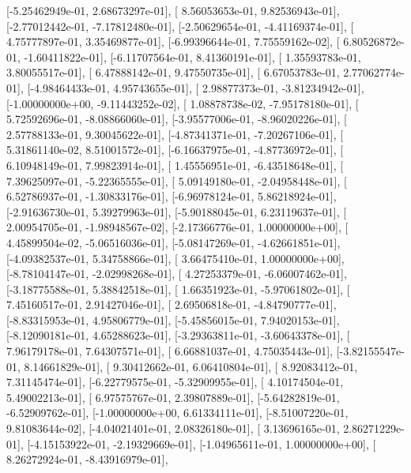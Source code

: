 \documentclass{article}
\begin{document}
       [-5.25462949e-01,  2.68673297e-01],
       [ 8.56053653e-01,  9.82536943e-01],
       [-2.77012442e-01, -7.17812480e-01],
       [-2.50629654e-01, -4.41169374e-01],
       [ 4.75777897e-01,  3.35469877e-01],
       [-6.99396644e-01,  7.75559162e-02],
       [ 6.80526872e-01, -1.60411822e-01],
       [-6.11707564e-01,  8.41360191e-01],
       [ 1.35593783e-01,  3.80055517e-01],
       [ 6.47888142e-01,  9.47550735e-01],
       [ 6.67053783e-01,  2.77062774e-01],
       [-4.98464433e-01,  4.95743655e-01],
       [ 2.98877373e-01, -3.81234942e-01],
       [-1.00000000e+00, -9.11443252e-02],
       [ 1.08878738e-02, -7.95178180e-01],
       [ 5.72592696e-01, -8.08866060e-01],
       [-3.95577006e-01, -8.96020226e-01],
       [ 2.57788133e-01,  9.30045622e-01],
       [-4.87341371e-01, -7.20267106e-01],
       [ 5.31861140e-02,  8.51001572e-01],
       [-6.16637975e-01, -4.87736972e-01],
       [ 6.10948149e-01,  7.99823914e-01],
       [ 1.45556951e-01, -6.43518648e-01],
       [ 7.39625097e-01, -5.22365555e-01],
       [ 5.09149180e-01, -2.04958448e-01],
       [ 6.52786937e-01, -1.30833176e-01],
       [-6.96978124e-01,  5.86218924e-01],
       [-2.91636730e-01,  5.39279963e-01],
       [-5.90188045e-01,  6.23119637e-01],
       [ 2.00954705e-01, -1.98948567e-02],
       [-2.17366776e-01,  1.00000000e+00],
       [ 4.45899504e-02, -5.06516036e-01],
       [-5.08147269e-01, -4.62661851e-01],
       [-4.09382537e-01,  5.34758866e-01],
       [ 3.66475410e-01,  1.00000000e+00],
       [-8.78104147e-01, -2.02998268e-01],
       [ 4.27253379e-01, -6.06007462e-01],
       [-3.18775588e-01,  5.38842518e-01],
       [ 1.66351923e-01, -5.97061802e-01],
       [ 7.45160517e-01,  2.91427046e-01],
       [ 2.69506818e-01, -4.84790777e-01],
       [-8.83315953e-01,  4.95806779e-01],
       [-5.45856015e-01,  7.94020153e-01],
       [-8.12090181e-01,  4.65288623e-01],
       [-3.29363811e-01, -3.60643378e-01],
       [ 7.96179178e-01,  7.64307571e-01],
       [ 6.66881037e-01,  4.75035443e-01],
       [-3.82155547e-01,  8.14661829e-01],
       [ 9.30412662e-01,  6.06410804e-01],
       [ 8.92083412e-01,  7.31145474e-01],
       [-6.22779575e-01, -5.32909955e-01],
       [ 4.10174504e-01,  5.49002213e-01],
       [ 6.97575767e-01,  2.39807889e-01],
       [-5.64282819e-01, -6.52909762e-01],
       [-1.00000000e+00,  6.61334111e-01],
       [-8.51007220e-01,  9.81083644e-02],
       [-4.04021401e-01,  2.08326180e-01],
       [ 3.13696165e-01,  2.86271229e-01],
       [-4.15153922e-01, -2.19329669e-01],
       [-1.04965611e-01,  1.00000000e+00],
       [ 8.26272924e-01, -8.43916979e-01],
\end{document}
